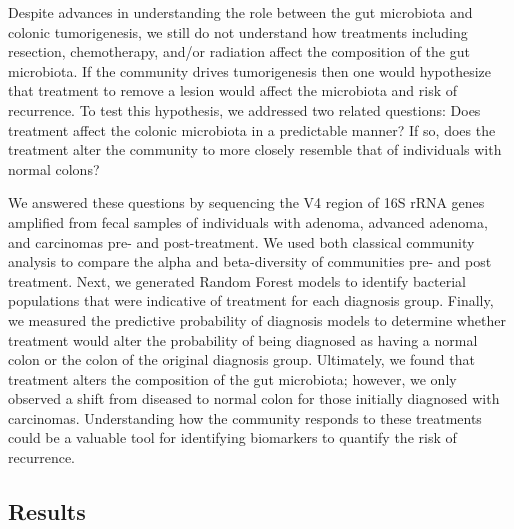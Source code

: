 \documentclass[12pt,]{article}
\begin{document}
Despite advances in understanding the role between the gut microbiota
and colonic tumorigenesis, we still do not understand how treatments
including resection, chemotherapy, and/or radiation affect the
composition of the gut microbiota. If the community drives tumorigenesis
then one would hypothesize that treatment to remove a lesion would
affect the microbiota and risk of recurrence. To test this hypothesis,
we addressed two related questions: Does treatment affect the colonic
microbiota in a predictable manner? If so, does the treatment alter the
community to more closely resemble that of individuals with normal
colons?

We answered these questions by sequencing the V4 region of 16S rRNA
genes amplified from fecal samples of individuals with adenoma, advanced
adenoma, and carcinomas pre- and post-treatment. We used both classical
community analysis to compare the alpha and beta-diversity of
communities pre- and post treatment. Next, we generated Random Forest
models to identify bacterial populations that were indicative of
treatment for each diagnosis group. Finally, we measured the predictive
probability of diagnosis models to determine whether treatment would
alter the probability of being diagnosed as having a normal colon or the
colon of the original diagnosis group. Ultimately, we found that
treatment alters the composition of the gut microbiota; however, we only
observed a shift from diseased to normal colon for those initially
diagnosed with carcinomas. Understanding how the community responds to
these treatments could be a valuable tool for identifying biomarkers to
quantify the risk of recurrence.

\newpage

\subsection{Results}\label{results}
\end{document}

